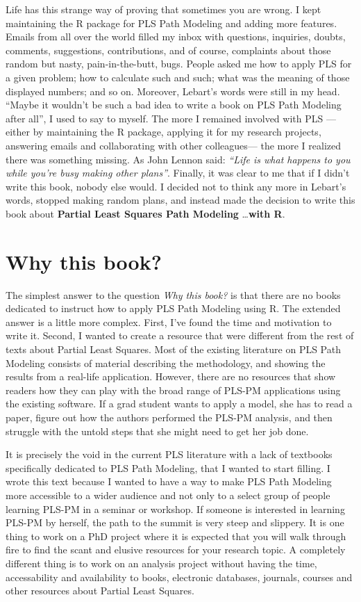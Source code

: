 \documentclass[12pt]{book}\usepackage{graphicx, color}
\begin{document}
Life has this strange way of proving that sometimes you are wrong. I kept maintaining the R package for PLS Path Modeling and adding more features. Emails from all over the world filled my inbox with questions, inquiries, doubts, comments, suggestions, contributions, and of course, complaints about those random but nasty, pain-in-the-butt, bugs. People asked me how to apply PLS for a given problem; how to calculate such and such; what was the meaning of those displayed numbers; and so on. Moreover, Lebart's words were still in my head. ``Maybe it wouldn't be such a bad idea to write a book on PLS Path Modeling after all'', I used to say to myself. The more I remained involved with PLS ---either by maintaining the R package, applying it for my research projects, answering emails and collaborating with other colleagues--- the more I realized there was something missing. As John Lennon said: \textit{``Life is what happens to you while you're busy making other plans''}. Finally, it was clear to me that if I didn't write this book, nobody else would. I decided not to think any more in Lebart's words, stopped making random plans, and instead made the decision to write this book about \textbf{Partial Least Squares Path Modeling} \dots \textbf{with R}. 


\section*{Why this book?}
The simplest answer to the question \textit{Why this book?} is that there are no books dedicated to instruct how to apply PLS Path Modeling using R. The extended answer is a little more complex. First, I've found the time and motivation to write it. Second, I wanted to create a resource that were different from the rest of texts about Partial Least Squares. Most of the existing literature on PLS Path Modeling consists of material describing the methodology, and showing the results from a real-life application. However, there are no resources that show readers how they can play with the broad range of PLS-PM applications using the existing software. If a grad student wants to apply a model, she has to read a paper, figure out how the authors performed the PLS-PM analysis, and then struggle with the untold steps that she might need to get her job done.

It is precisely the void in the current PLS literature with a lack of textbooks specifically dedicated to PLS Path Modeling, that I wanted to start filling. I wrote this text because I wanted to have a way to make PLS Path Modeling more accessible to a wider audience and not only to a select group of people learning PLS-PM in a seminar or workshop. If someone is interested in learning PLS-PM by herself, the path to the summit is very steep and slippery. It is one thing to work on a PhD project where it is expected that you will walk through fire to find the scant and elusive resources for your research topic. A completely different thing is to work on an analysis project without having the time, accessability and availability to books, electronic databases, journals, courses and other resources about Partial Least Squares. 
\end{document}
